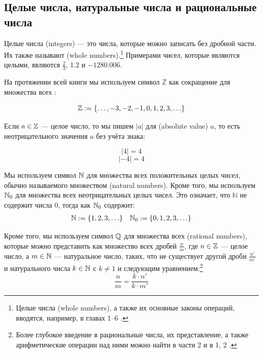 \subsection{Целые числа, натуральные числа и рациональные числа}

Целые числа (integers) — это числа, которые можно записать без дробной части. Их также называют  (whole numbers).\footnote{Целые числа (whole numbers), а также их основные законы операций, вводятся, например, в главах 1–6 \cite{wu-1}.} Примерами чисел, которые  являются целыми, являются $\frac{2}{3}$, $1.2$ и $-1280.006$.

На протяжении всей книги мы используем символ $\mathbb{Z}$ как сокращение для множества всех :

\begin{equation}
\label{integer_symbol}
\mathbb{Z} := \{\ldots, -3,-2,-1,0,1,2,3,\ldots\}
\end{equation}

Если $a\in \mathbb{Z}$ — целое число, то мы пишем $|a|$ для  (absolute value) $a$, то есть неотрицательного значения $a$ без учёта знака:

\begin{equation}
|4|= 4
\end{equation}
\begin{equation}
|-4|= 4
\end{equation}

Мы используем символ $\mathbb{N}$ для множества всех положительных целых чисел, обычно называемого множеством  (natural numbers). Кроме того, мы используем $\mathbb{N}_0$ для множества всех неотрицательных целых чисел. Это означает, что $\mathbb{N}$ не содержит числа $0$, тогда как $\mathbb{N}_0$ содержит:
\begin{align*}
\label{natural_symbol}
\mathbb{N} := \{1,2,3,\ldots\} & & \mathbb{N}_0 := \{0,1,2,3,\ldots\}
\end{align*}

Кроме того, мы используем символ $\mathbb{Q}$ для множества всех  (rational numbers), которые можно представить как множество всех дробей $\frac{n}{m}$, где $n\in \mathbb{Z}$ — целое число, а $m\in \mathbb{N}$ — натуральное число, таких, что не существует другой дроби $\frac{n'}{m'}$ и натурального числа $k\in \mathbb{N}$ с $k\neq 1$ и следующим уравнением:\footnote{Более глубокое введение в рациональные числа, их представление, а также арифметические операции над ними можно найти в части 2 \cite{wu-1} и в \chaptname{} 1, \secname{} 2 \cite{mignotte-1992}.}
\begin{equation}
\frac{n}{m} = \frac{k\cdot n'}{k\cdot m'}
\end{equation}

